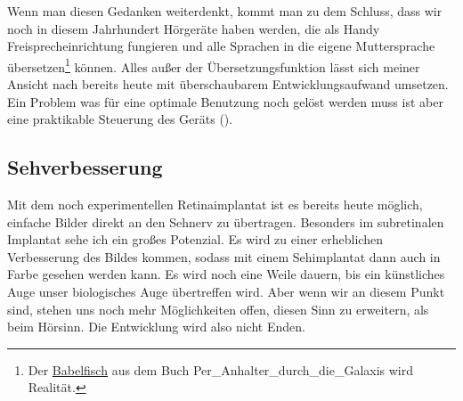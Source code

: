 Wenn man diesen Gedanken weiterdenkt, kommt man zu dem Schluss, dass wir noch in diesem Jahrhundert
Hörgeräte haben werden, die als Handy Freisprecheinrichtung fungieren und alle
\label{sec:Robin:future:hearing:Babel_Fish}%
Sprachen in die
eigene Muttersprache übersetzen\footnote{Der
\href{http://de.wikipedia.org/wiki/Babelfisch}{Babelfisch} aus dem Buch \citetitle
{Per_Anhalter_durch_die_Galaxis} wird Realität.} können. Alles außer der Übersetzungsfunktion lässt
sich meiner Ansicht nach bereits
heute mit überschaubarem Entwicklungsaufwand umsetzen. Ein Problem was für eine optimale Benutzung
noch gelöst werden muss ist aber eine praktikable Steuerung des Geräts
().

\subsection{Sehverbesserung}
Mit dem noch experimentellen Retinaimplantat ist es bereits heute möglich, einfache Bilder direkt
an den Sehnerv zu übertragen. Besonders im subretinalen Implantat sehe ich ein großes Potenzial. Es
wird zu einer erheblichen Verbesserung des Bildes kommen, sodass mit einem Sehimplantat dann auch in
Farbe gesehen werden kann. Es wird noch eine Weile dauern, bis ein künstliches Auge unser
biologisches Auge übertreffen wird. Aber wenn wir an diesem Punkt sind, stehen uns noch mehr
Möglichkeiten offen, diesen Sinn zu erweitern, als beim Hörsinn. Die Entwicklung wird also nicht
Enden.

